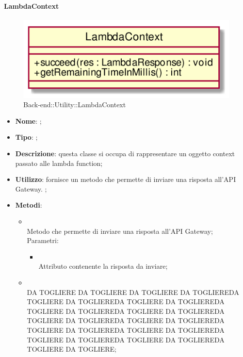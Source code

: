 \hypertarget{LambdaContext_label}{\paragraph{LambdaContext}}
\begin{figure}[h]
	\centering
	\includegraphics[width=\textwidth,height=\textheight,keepaspectratio]{images/ClassLambdaContext.png}
	\caption{Back-end::Utility::LambdaContext}
\end{figure}
\begin{itemize}
	\item \textbf{Nome}: ;
	\item \textbf{Tipo}: ;
	\item \textbf{Descrizione}: questa classe si occupa di rappresentare un oggetto context passato alle lambda function;
	\item \textbf{Utilizzo}: fornisce un metodo che permette di inviare una risposta all'API Gateway. ;
	\item \textbf{Metodi}:
	\begin{itemize}
		\item[]  \\
		Metodo che permette di inviare una risposta all'API Gateway;\\
		Parametri:
		\begin{itemize}
			\item {} \\
			Attributo contenente la risposta da inviare;
		\end{itemize}
		\item[]  \\
		DA TOGLIERE DA TOGLIERE DA TOGLIERE DA TOGLIEREDA TOGLIERE DA TOGLIEREDA TOGLIERE DA TOGLIEREDA TOGLIERE DA TOGLIEREDA TOGLIERE DA TOGLIEREDA TOGLIERE DA TOGLIEREDA TOGLIERE DA TOGLIEREDA TOGLIERE DA TOGLIEREDA TOGLIERE DA TOGLIEREDA TOGLIERE DA TOGLIEREDA TOGLIERE DA TOGLIEREDA TOGLIERE DA TOGLIERE;\\
	\end{itemize}
\end{itemize}

